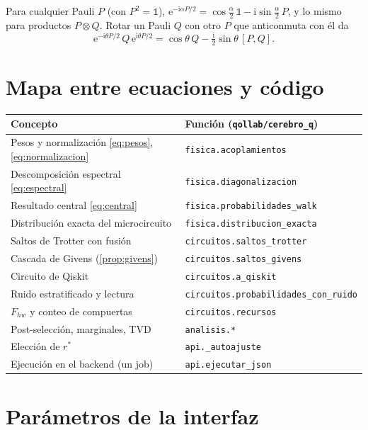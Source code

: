 \documentclass[11pt,a4paper]{article}
\newcommand{\e}{\mathrm{e}}
\newcommand{\ii}{\mathrm{i}}
\newcommand{\code}[1]{\texttt{#1}}
\theoremstyle{plain}
\theoremstyle{definition}
\theoremstyle{remark}
\begin{document}
Para cualquier Pauli $P$ (con $P^2=\mathbb 1$), $\e^{-\ii\alpha P/2}=\cos\frac\alpha2\,\mathbb 1-\ii\sin\frac\alpha2\,P$, y lo mismo para productos $P\otimes Q$. Rotar un Pauli $Q$ con otro $P$ que anticonmuta con él da
\begin{equation}
\e^{-\ii\theta P/2}\,Q\,\e^{\ii\theta P/2}=\cos\theta\,Q-\tfrac{\ii}{2}\sin\theta\,[P,Q].
\end{equation}

\section{Mapa entre ecuaciones y código}
\label{app:codigo}

\begin{center}
\renewcommand{\arraystretch}{1.15}
\begin{tabular}{@{}L{0.42\textwidth}L{0.52\textwidth}@{}}
\toprule
\textbf{Concepto} & \textbf{Función (\code{qollab/cerebro\_q})}\\
\midrule
Pesos y normalización \eqref{eq:pesos}, \eqref{eq:normalizacion} & \code{fisica.acoplamientos}\\
Descomposición espectral \eqref{eq:espectral} & \code{fisica.diagonalizacion}\\
Resultado central \eqref{eq:central} & \code{fisica.probabilidades\_walk}\\
Distribución exacta del microcircuito & \code{fisica.distribucion\_exacta}\\
Saltos de Trotter con fusión & \code{circuitos.saltos\_trotter}\\
Cascada de Givens (\cref{prop:givens}) & \code{circuitos.saltos\_givens}\\
Circuito de Qiskit & \code{circuitos.a\_qiskit}\\
Ruido estratificado y lectura & \code{circuitos.probabilidades\_con\_ruido}\\
$F_{hw}$ y conteo de compuertas & \code{circuitos.recursos}\\
Post-selección, marginales, TVD & \code{analisis.*}\\
Elección de $r^*$ & \code{api.\_autoajuste}\\
Ejecución en el backend (un job) & \code{api.ejecutar\_json}\\
\bottomrule
\end{tabular}
\end{center}

\section{Parámetros de la interfaz}
\end{document}
